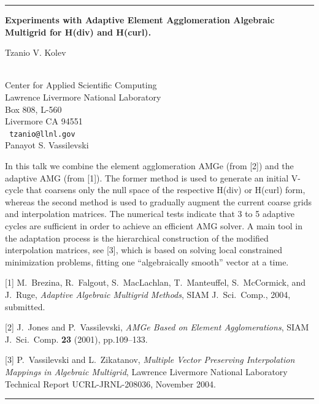 \documentclass[twosided]{report}
\begin{document}
\begin{center}

\rule{6in}{1pt}
\end{center}

\begin{center}
{\large			\label{kolev}
{\bf
Experiments with Adaptive Element Agglomeration Algebraic Multigrid for
H(div) and H(curl).
}

Tzanio V. Kolev} \\
Center for Applied Scientific Computing \\
Lawrence Livermore National Laboratory \\
Box 808, L-560 \\ Livermore CA 94551
\\ {\tt
tzanio@llnl.gov
}
\\
Panayot S. Vassilevski
\end{center}

In this talk we combine the element agglomeration AMGe (from [2]) and
the adaptive AMG (from [1]). The former method is used to generate an
initial V-cycle that coarsens only the null space of the respective
H(div) or H(curl) form, whereas the second method is used to gradually
augment the current coarse grids and interpolation matrices. The
numerical tests indicate that 3 to 5 adaptive cycles are sufficient in
order to achieve an efficient AMG solver. A main tool in the adaptation
process is the hierarchical construction of the modified interpolation
matrices, see [3], which is based on solving local constrained
minimization problems, fitting one ``algebraically smooth'' vector at a
time.

[1] M.~Brezina, R.~Falgout, S.~MacLachlan, T.~Manteuffel, S.~McCormick,
and J.~Ruge, {\em Adaptive Algebraic Multigrid Methods},
SIAM J.~Sci.~Comp., 2004, submitted.

[2] J.~Jones and P.~Vassilevski, {\em AMGe Based on Element
Agglomerations}, SIAM J.~Sci.~Comp. {\bf 23} (2001), pp.109--133.

[3] P.~Vassilevski and L.~Zikatanov,
{\em Multiple Vector Preserving
Interpolation Mappings in Algebraic Multigrid},
Lawrence Livermore
National Laboratory Technical Report UCRL-JRNL-208036, November 2004.


\begin{center} \rule{6in}{1pt} \end{center}
\end{document}
